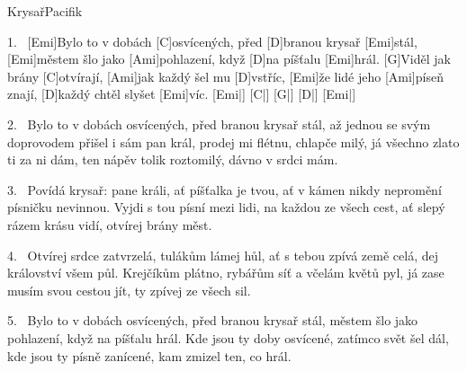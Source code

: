 \begin{song}{Krysař}{Pacifik}

\begin{xverse}{1.~}
[\large Emi]Bylo to v dobách [\large C]osvícených, před [\large D]branou krysař [\large Emi]stál,
[\large Emi]městem šlo jako [\large Ami]pohlazení, když [\large D]na píšťalu [\large Emi]hrál.
[\large G]Viděl jak brány [\large C]otvírají, [\large Ami]jak každý šel mu [\large D]vstříc,
[\large Emi]{že} lidé jeho [\large Ami]píseň znají, [\large D]každý chtěl slyšet [\large Emi]víc.
[\large Emi|]{ } [\large C|]{ } [\large G|]{ } [\large D|]{ } [\large Emi|]{ }
\end{xverse}


\begin{xverse}{2.~}
Bylo to v dobách osvícených, před branou krysař stál,
až jednou se svým doprovodem přišel i sám pan král,
prodej mi flétnu, chlapče milý, já všechno zlato ti za ni dám,
ten nápěv tolik roztomilý, dávno v srdci mám.
\end{xverse}


\begin{xverse}{3.~}
Povídá krysař: pane králi, ať píšťalka je tvou,
ať v kámen nikdy nepromění písničku nevinnou.
Vyjdi s tou písní mezi lidi, na každou ze všech cest,
ať slepý rázem krásu vidí, otvírej brány měst.
\end{xverse}


\begin{xverse}{4.~}
Otvírej srdce zatvrzelá, tulákům lámej hůl,
ať s tebou zpívá země celá, dej království všem půl.
Krejčíkům plátno, rybářům síť a včelám květů pyl,
já zase musím svou cestou jít, ty zpívej ze všech sil.
\end{xverse}


\begin{xverse}{5.~}
Bylo to v dobách osvícených, před branou krysař stál,
městem šlo jako pohlazení, když na píšťalu hrál.
Kde jsou ty doby osvícené, zatímco svět šel dál,
kde jsou ty písně zanícené, kam zmizel ten, co hrál.
\end{xverse}
\end{song}

